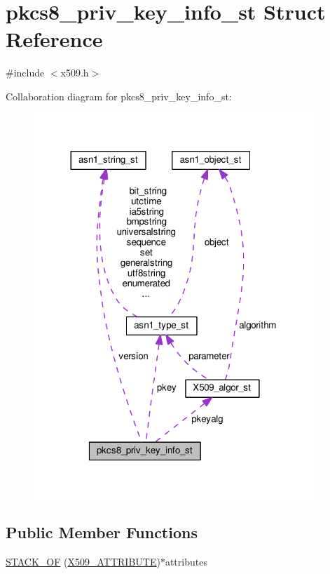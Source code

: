 \hypertarget{structpkcs8__priv__key__info__st}{}\section{pkcs8\+\_\+priv\+\_\+key\+\_\+info\+\_\+st Struct Reference}
\label{structpkcs8__priv__key__info__st}


{\ttfamily \#include $<$x509.\+h$>$}



Collaboration diagram for pkcs8\+\_\+priv\+\_\+key\+\_\+info\+\_\+st\+:
\nopagebreak
\begin{figure}[H]
\begin{center}
\leavevmode
\includegraphics[width=300pt]{structpkcs8__priv__key__info__st__coll__graph}
\end{center}
\end{figure}
\subsection*{Public Member Functions}
\begin{DoxyCompactItemize}
\item 
\hyperlink{structpkcs8__priv__key__info__st_ab054fe497c497b9eab7901a2de8868e4}{S\+T\+A\+C\+K\+\_\+\+OF} (\hyperlink{x509_8h_aa4f1a62a9d2dd8cb6780fe2713737c0f}{X509\+\_\+\+A\+T\+T\+R\+I\+B\+U\+TE})$\ast$attributes
\end{DoxyCompactItemize}
